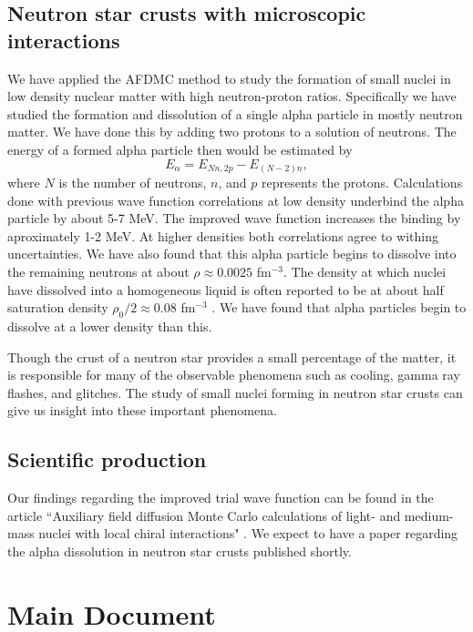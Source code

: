 \documentclass[12pt,letterpaper]{article}
\begin{document}
\subsection{Neutron star crusts with microscopic interactions}
We have applied the AFDMC method to study the formation of small nuclei in low density nuclear matter with high neutron-proton ratios. Specifically we have studied the formation and dissolution of a single alpha particle in mostly neutron matter. We have done this by adding two protons to a solution of neutrons. The energy of a formed alpha particle then would be estimated by
\begin{equation}
   E_\alpha = E_{Nn,2p} - E_{(N-2)n},
\end{equation}
where $N$ is the number of neutrons, $n$, and $p$ represents the protons. Calculations done with previous wave function correlations at low density underbind the alpha particle by about 5-7 MeV. The improved wave function increases the binding by aproximately 1-2 MeV. At higher densities both correlations agree to withing uncertainties. We have also found that this alpha particle begins to dissolve into the remaining neutrons at about $\rho\approx0.0025$ fm$^{-3}$. The density at which nuclei have dissolved into a homogeneous liquid is often reported to be at about half saturation density $\rho_0/2 \approx 0.08$ fm$^{-3}$ \cite{chamel2015}. We have found that alpha particles begin to dissolve at a lower density than this.

Though the crust of a neutron star provides a small percentage of the matter, it is responsible for many of the observable phenomena such as cooling, gamma ray flashes, and glitches. The study of small nuclei forming in neutron star crusts can give us insight into these important phenomena.

\subsection{Scientific production}
Our findings regarding the improved trial wave function can be found in the article ``Auxiliary field diffusion Monte Carlo calculations of light- and medium-mass nuclei with local chiral interactions" \cite{lonardoni2018}. We expect to have a paper regarding the alpha dissolution in neutron star crusts published shortly.

\section{Main Document}
\end{document}
